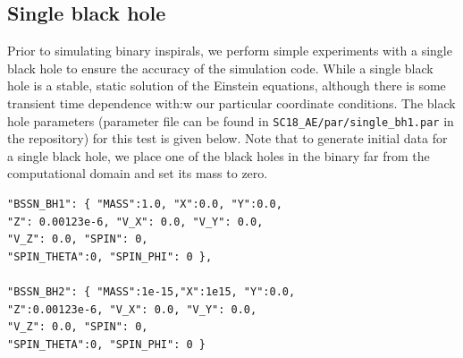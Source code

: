 \subsection{Single black hole}
\label{sec:AE_sbh}

Prior to simulating binary inspirals, we perform simple experiments
with a single black hole to ensure the accuracy of the simulation code. 
While a single black hole is a stable, static solution of the Einstein 
equations, although there is some transient time dependence with:w
 our particular 
coordinate conditions.
The black hole
parameters (parameter file can be found in
\texttt{SC18\_AE/par/single\_bh1.par} in the repository) for this
test is given below. Note that to generate initial data for a single black
hole, we place one of the black holes in the binary far from the computational
domain and set its mass to zero.

\begin{lstlisting}[basicstyle=\small]
"BSSN_BH1": { "MASS":1.0, "X":0.0, "Y":0.0, 
"Z": 0.00123e-6, "V_X": 0.0, "V_Y": 0.0, 
"V_Z": 0.0, "SPIN": 0, 
"SPIN_THETA":0, "SPIN_PHI": 0 },

"BSSN_BH2": { "MASS":1e-15,"X":1e15, "Y":0.0, 
"Z":0.00123e-6, "V_X": 0.0, "V_Y": 0.0, 
"V_Z": 0.0, "SPIN": 0, 
"SPIN_THETA":0, "SPIN_PHI": 0 }
\end{lstlisting}


